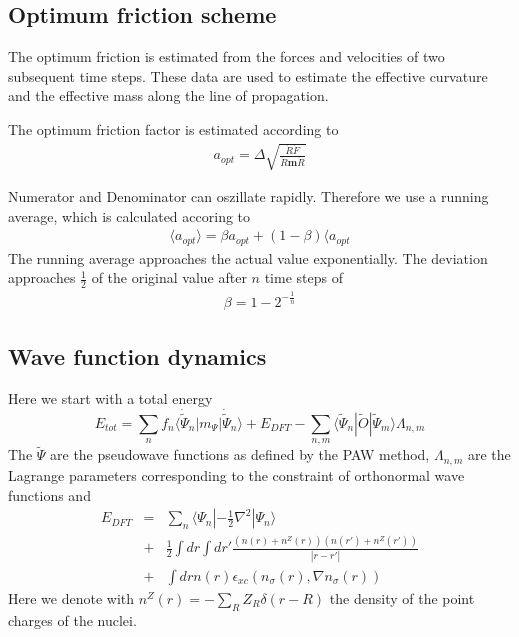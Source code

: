 \documentclass[final,12pt]{article}
\begin{document}
{{{{{{%
\subsection{Optimum friction scheme}
\label{sec:optfric}
The optimum friction is estimated from the forces and velocities of
two subsequent time steps. These data are used to estimate the
effective curvature and the effective mass along the line of
propagation.

The optimum friction factor is estimated according to
\begin{eqnarray*}
a_{opt}=\Delta\sqrt{\frac{\dot{R}\dot{F}}{\dot{R}\mathbf{m}\dot{R}}}
\end{eqnarray*}

Numerator and Denominator can oszillate rapidly. Therefore we use a
running average, which is calculated accoring to
\begin{eqnarray*}
\langle a_{opt}\rangle=\beta a_{opt}+(1-\beta)\langle a_{opt}
\end{eqnarray*}
The running average approaches the actual value exponentially. The
deviation approaches $\frac{1}{2}$ of the original value after $n$
time steps of
\begin{eqnarray*}
\beta=1-2^{-\frac{1}{n}}
\end{eqnarray*}


\subsection{Wave function dynamics}
Here we start with a total energy
\begin{equation}
E_{tot}=\sum_n f_n\langle\dot{\tilde\Psi}_n|m_\Psi|\dot{\tilde\Psi}_n\rangle+E_{DFT}
-\sum_{n,m} \langle\tilde\Psi_n|\tilde{O}|\tilde\Psi_m\rangle\Lambda_{n,m}
\end{equation}
The $\tilde\Psi$ are the pseudowave functions as defined by the PAW
method, $\Lambda_{n,m}$ are the Lagrange parameters corresponding to
the constraint of orthonormal wave functions and 
\begin{eqnarray*}
E_{DFT}&=&\sum_n\langle\Psi_n|-\frac{1}{2}\nabla^2|\Psi_n\rangle
\\
&+&\frac{1}{2}\int dr \int dr' \frac{(n(r)+n^Z(r))(n(r')+n^Z(r'))}{|r-r'|}
\\
&+&\int dr n(r) \epsilon_{xc}(n_\sigma(r),\nabla n_\sigma(r))
\end{eqnarray*}
Here we denote with $n^Z(r)=-\sum_R Z_R\delta(r-R)$ the density of the
point charges of the nuclei. 

}}}}}}
\end{document}
